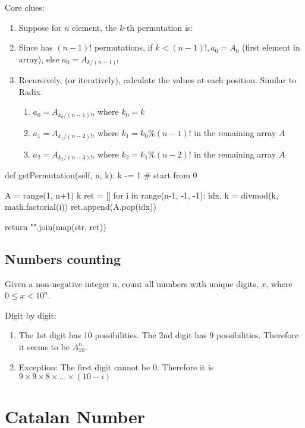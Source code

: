Core clues:
\begin{enumerate}
\item {}

Suppose for $n$ element, the $k$-th permutation is:

\item {} Since \pyinline{[a1, a3, ..., an-1]} has $(n-1)!$ permutations,
if $k < (n-1)!, a_0 = A_0$ (first element in array), else $a_0 = A_{k/(n-1)!}$

\item Recursively, (or iteratively), calculate the values at each position. Similar to Radix. 
\begin{enumerate}
\item $a_0 = A_{k_0/(n-1)!}$, where $k_0 = k$
\item $a_1 = A_{k_1/(n-2)!}$, where $k_1 = k_0\%(n-1)!$ in the remaining array $A$
\item $a_2 = A_{k_2/(n-3)!}$, where $k_2 = k_1\%(n-2)!$ in the remaining array $A$
\end{enumerate}
\end{enumerate}
\begin{python}
def getPermutation(self, n, k):
    k -= 1  # start from 0

    A = range(1, n+1)
    k %
    ret = []
    for i in range(n-1, -1, -1):
        idx, k = divmod(k, math.factorial(i))
        ret.append(A.pop(idx))

    return "".join(map(str, ret))
\end{python}

\subsection{Numbers counting}
 Given a non-negative integer n, count all numbers with unique digits, $x$, where $0 \leq x < 10^n$.

Digit by digit: 
\begin{enumerate}
\item The 1st digit has 10 possibilities. The 2nd digit has 9 possibilities. Therefore it seems to be $A_{10}^n$.
\item Exception: The first digit cannot be 0. Therefore it is $9\times 9\times 8\times ...\times (10-i)$
\end{enumerate}



\section{Catalan Number}\label{section:catalanNumber}
